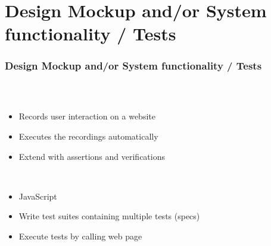 \section{Design Mockup and/or System functionality / Tests}

\begin{frame}
  \frametitle{Design Mockup and/or System functionality / Tests}
  \begin{columns}
    \begin{column}{0.8\textwidth}
      \begin{description}[]
        \item[Frontend] \hfill \\
        \begin{itemize}
          \item Records user interaction on a website
          \item Executes the recordings automatically
          \item Extend with assertions and verifications
        \end{itemize}

        \bigskip
        \item[Backend] \hfill \\
          \begin{itemize}
            \item JavaScript
            \item Write test suites containing multiple tests (specs)
            \item Execute tests by calling web page
        \end{itemize}
      \end{description}
    \end{column}


\end{columns}
\end{frame}

